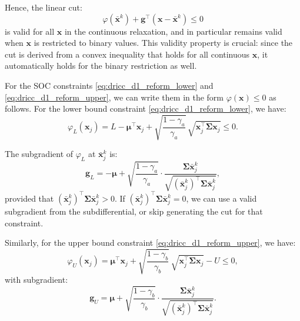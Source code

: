 \documentclass[preprint,12pt,authoryear]{elsarticle}
\begin{document}
Hence, the linear cut:
\begin{equation}
\varphi(\bar{\mathbf{x}}^k) + \mathbf{g}^\top (\mathbf{x} - \bar{\mathbf{x}}^k) \leqslant 0
\label{eq:supporting_hyperplane_cut}
\end{equation}
is valid for all $\mathbf{x}$ in the continuous relaxation, and in particular remains valid when $\mathbf{x}$ is restricted to binary values. This validity property is crucial: since the cut is derived from a convex inequality that holds for all continuous $\mathbf{x}$, it automatically holds for the binary restriction as well.

For the SOC constraints \eqref{eq:dricc_d1_reform_lower} and \eqref{eq:dricc_d1_reform_upper}, we can write them in the form $\varphi(\mathbf{x}) \leqslant 0$ as follows. For the lower bound constraint \eqref{eq:dricc_d1_reform_lower}, we have:
\begin{equation}
\varphi_L(\mathbf{x}_j) = L - \boldsymbol{\mu}^\top \mathbf{x}_j + \sqrt{\frac{1 - \gamma_a}{\gamma_a}} \, \sqrt{\mathbf{x}_j^\top \boldsymbol{\Sigma} \mathbf{x}_j} \leqslant 0.
\end{equation}

The subgradient of $\varphi_L$ at $\bar{\mathbf{x}}_j^k$ is:
\begin{equation}
\mathbf{g}_L = -\boldsymbol{\mu} + \sqrt{\frac{1 - \gamma_a}{\gamma_a}} \cdot \frac{\boldsymbol{\Sigma} \bar{\mathbf{x}}_j^k}{\sqrt{(\bar{\mathbf{x}}_j^k)^\top \boldsymbol{\Sigma} \bar{\mathbf{x}}_j^k}},
\end{equation}
provided that $(\bar{\mathbf{x}}_j^k)^\top \boldsymbol{\Sigma} \bar{\mathbf{x}}_j^k > 0$. If $(\bar{\mathbf{x}}_j^k)^\top \boldsymbol{\Sigma} \bar{\mathbf{x}}_j^k = 0$, we can use a valid subgradient from the subdifferential, or skip generating the cut for that constraint.

Similarly, for the upper bound constraint \eqref{eq:dricc_d1_reform_upper}, we have:
\begin{equation}
\varphi_U(\mathbf{x}_j) = \boldsymbol{\mu}^\top \mathbf{x}_j + \sqrt{\frac{1 - \gamma_b}{\gamma_b}} \, \sqrt{\mathbf{x}_j^\top \boldsymbol{\Sigma} \mathbf{x}_j} - U \leqslant 0,
\end{equation}
with subgradient:
\begin{equation}
\mathbf{g}_U = \boldsymbol{\mu} + \sqrt{\frac{1 - \gamma_b}{\gamma_b}} \cdot \frac{\boldsymbol{\Sigma} \bar{\mathbf{x}}_j^k}{\sqrt{(\bar{\mathbf{x}}_j^k)^\top \boldsymbol{\Sigma} \bar{\mathbf{x}}_j^k}}.
\end{equation}
\end{document}
